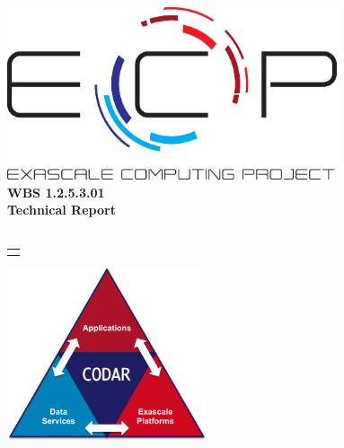 

\begin{titlepage}
  \vspace*{1\baselineskip}
  \begin{center}
    \includegraphics[height=2in]{Figs/ecp.eps}\\
    \baselineskip
    \Large
    \textbf{WBS 1.2.5.3.01}\\
    \textbf{Technical Report \ID{}}\\
    \baselineskip
    \textbf{\TITLE{}}\\
    \baselineskip
    \def\and{\\}%
    \setlength\tabcolsep{0pt}
    \begin{tabular}[t]{c}
      \AUTHOR{}
    \end{tabular}
    \baselineskip
    \DATE{}
    \baselineskip
    \includegraphics[height=2in]{Figs/CODAR.png}
  \end{center}
\end{titlepage}
\newpage
{}

